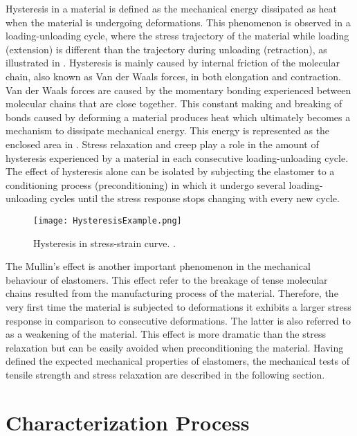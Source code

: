Hysteresis in a material is defined as the mechanical energy dissipated as heat when the material is undergoing deformations. This phenomenon is observed in a loading-unloading cycle, where the stress trajectory of the material while loading (extension) is different than the trajectory during unloading (retraction), as illustrated in . Hysteresis is mainly caused by internal friction of the molecular chain, also known as Van der Waals forces, in both elongation and contraction. Van der Waals forces are caused by the momentary bonding experienced between molecular chains that are close together. This constant making and breaking of bonds caused by deforming a material produces heat which ultimately becomes a mechanism to dissipate mechanical energy. This energy is represented as the enclosed area in . Stress relaxation and creep play a role in the amount of hysteresis experienced by a material in each consecutive loading-unloading cycle. The effect of hysteresis alone can be isolated by subjecting the elastomer to a conditioning process (preconditioning) in which it undergo several loading-unloading cycles until the stress response stops changing with every new cycle.

\begin{figure}[htb!]
    \centering
    \texttt{[image: HysteresisExample.png]}
    \caption{Hysteresis in stress-strain curve. \cite{Bauman2008}.}
    \label{fig:hysteresis}
\end{figure}

The Mullin's effect is another important phenomenon in the mechanical behaviour of elastomers. This effect refer to the breakage of tense molecular chains resulted from the manufacturing process of the material. Therefore, the very first time the material is subjected to deformations it exhibits a larger stress response in comparison to consecutive deformations. The latter is also referred to as a weakening of the material. This effect is more dramatic than the stress relaxation but can be easily avoided when preconditioning the material. Having defined the expected mechanical properties of elastomers, the mechanical tests of tensile strength and stress relaxation are described in the following section.

\section{Characterization Process}

